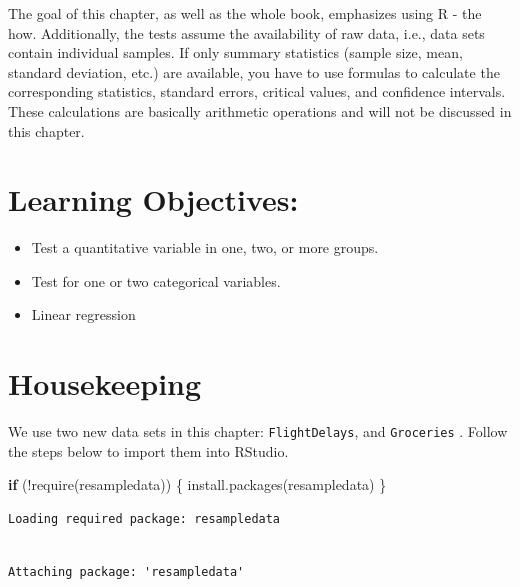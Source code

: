 \documentclass[
  letterpaper,
  DIV=11,
  numbers=noendperiod]{scrreprt}
\newenvironment{Shaded}{\begin{snugshade}}{\end{snugshade}}
\newcommand{\ControlFlowTok}[1]{\textcolor[rgb]{0.00,0.23,0.31}{\textbf{#1}}}
\newcommand{\FunctionTok}[1]{\textcolor[rgb]{0.28,0.35,0.67}{#1}}
\newcommand{\NormalTok}[1]{\textcolor[rgb]{0.00,0.23,0.31}{#1}}
\newcommand{\SpecialCharTok}[1]{\textcolor[rgb]{0.37,0.37,0.37}{#1}}
\newcommand{\StringTok}[1]{\textcolor[rgb]{0.13,0.47,0.30}{#1}}
\begin{document}
The goal of this chapter, as well as the whole book, emphasizes using R
- the how. Additionally, the tests assume the availability of raw data,
i.e., data sets contain individual samples. If only summary statistics
(sample size, mean, standard deviation, etc.) are available, you have to
use formulas to calculate the corresponding statistics, standard errors,
critical values, and confidence intervals. These calculations are
basically arithmetic operations and will not be discussed in this
chapter.

\section*{Learning Objectives:}\label{learning-objectives-3}


\begin{itemize}
\item
  Test a quantitative variable in one, two, or more groups.
\item
  Test for one or two categorical variables.
\item
  Linear regression
\end{itemize}

\section{Housekeeping}\label{housekeeping}

We use two new data sets in this chapter: \texttt{FlightDelays}, and
\texttt{Groceries} . Follow the steps below to import them into RStudio.

\begin{Shaded}
\begin{Highlighting}[]
\ControlFlowTok{if}\NormalTok{ (}\SpecialCharTok{!}\FunctionTok{require}\NormalTok{(resampledata)) \{}
  \FunctionTok{install.packages}\NormalTok{(}\StringTok{\textquotesingle{}resampledata\textquotesingle{}}\NormalTok{)}
\NormalTok{\}}
\end{Highlighting}
\end{Shaded}

\begin{verbatim}
Loading required package: resampledata
\end{verbatim}

\begin{verbatim}

Attaching package: 'resampledata'
\end{verbatim}
\end{document}
